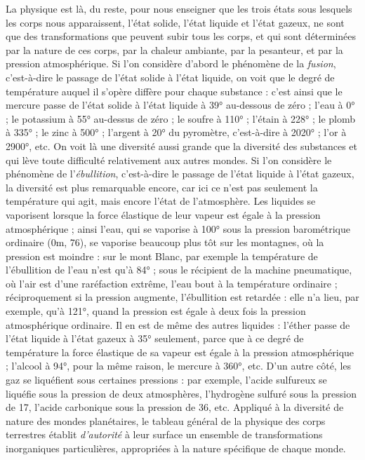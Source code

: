 \documentclass[a4paper, 11pt, oneside]{article}
\begin{document}
La physique est là, du reste, pour nous enseigner que les trois états sous lesquels les corps nous apparaissent, l'état solide, l'état liquide et l'état gazeux, ne sont que des transformations que peuvent subir tous les corps, et qui sont déterminées par la nature de ces corps, par la chaleur ambiante, par la pesanteur, et par la pression atmosphérique. Si l'on considère d'abord le phénomène de la \emph{fusion}, c'est-à-dire le passage de l'état solide à l'état liquide, on voit que le degré de température auquel il s'opère diffère pour chaque substance : c'est ainsi que le mercure passe de l'état solide à l'état liquide à 39° au-dessous de zéro ; l'eau à 0° ; le potassium à 55° au-dessus de zéro ; le soufre à 110° ; l'étain à 228° ; le plomb à 335° ; le zinc à 500° ; l'argent à 20° du pyromètre, c'est-à-dire à 2020° ; l'or à 2900°, etc. On voit là une diversité aussi grande que la diversité des substances et qui lève toute difficulté relativement aux autres mondes. Si l'on considère le phénomène de l'\emph{ébullition}, c'est-à-dire le passage de l'état liquide à l'état gazeux, la diversité est plus remarquable encore, car ici ce n'est pas seulement la température qui agit, mais encore l'état de l'atmosphère. Les liquides se vaporisent lorsque la force élastique de leur vapeur est égale à la pression atmosphérique ; ainsi l'eau, qui se vaporise à 100° sous la pression barométrique ordinaire (0m, 76), se vaporise beaucoup plus tôt sur les montagnes, où la pression est moindre : sur le mont Blanc, par exemple la température de l'ébullition de l'eau n'est qu'à 84° ; sous le récipient de la machine pneumatique, où l'air est d'une raréfaction extrême, l'eau bout à la température ordinaire ; réciproquement si la pression augmente, l'ébullition est retardée : elle n'a lieu, par exemple, qu'à 121°, quand la pression est égale à deux fois la pression atmosphérique ordinaire. Il en est de même des autres liquides : l'éther passe de l'état liquide à l'état gazeux à 35° seulement, parce que à ce degré de température la force élastique de sa vapeur est égale à la pression atmosphérique ; l'alcool à 94°, pour la même raison, le mercure à 360°, etc. D'un autre côté, les gaz se liquéfient sous certaines pressions : par exemple, l'acide sulfureux se liquéfie sous la pression de deux atmosphères, l'hydrogène sulfuré sous la pression de 17, l'acide carbonique sous la pression de 36, etc. Appliqué à la diversité de nature des mondes planétaires, le tableau général de la physique des corps terrestres établit \emph{d'autorité} à leur surface un ensemble de transformations inorganiques particulières, appropriées à la nature spécifique de chaque monde.
\end{document}
